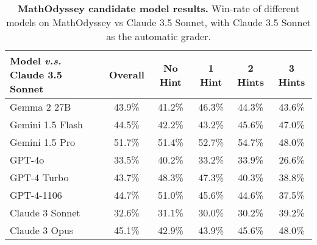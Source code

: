 \begin{table*}[h]
\vspace{0em}
\begin{center}
\setlength{\tabcolsep}{10pt}
{\small
\begin{tabular}{l c | cccc}
\addlinespace
\toprule

\textbf{Model} \emph{v.s.} Claude 3.5 Sonnet               & \textbf{Overall}  & {No Hint}  & {1 Hint}  & {2 Hints} & {3 Hints} \\
\midrule 

Gemma 2 27B                                            & 43.9\%            & 41.2\%     & 46.3\%    & 44.3\%    & 43.6\% \\
Gemini 1.5 Flash                                           & 44.5\%            & 42.2\%     & 43.2\%    & 45.6\%    & 47.0\% \\
Gemini 1.5 Pro                                             & 51.7\%            & 51.4\%     & 52.7\%    & 54.7\%    & 48.0\% \\
GPT-4o                                                 & 33.5\%            & 40.2\%     & 33.2\%    & 33.9\%    & 26.6\% \\
GPT-4 Turbo                                            & 43.7\%            & 48.3\%     & 47.3\%    & 40.3\%    & 38.8\% \\
GPT-4-1106                                             & 44.7\%            & 51.0\%     & 45.6\%    & 44.6\%    & 37.5\% \\
Claude 3 Sonnet                                        & 32.6\%            & 31.1\%     & 30.0\%    & 30.2\%    & 39.2\% \\
Claude 3 Opus                                          & 45.1\%            & 42.9\%     & 43.9\%    & 45.6\%    & 48.0\% \\

\bottomrule
\end{tabular}
}

\begin{minipage}[t]{0.85\textwidth}
    \vspace{0.75em}
    \caption{
        \small
        \textbf{MathOdyssey candidate model results.}
        Win-rate of different models on MathOdyssey vs Claude 3.5 Sonnet, with Claude 3.5 Sonnet as the automatic grader.
    }
    \label{tab:math_odyssey}
\end{minipage}
\end{center}
\vspace{0em}
\end{table*}